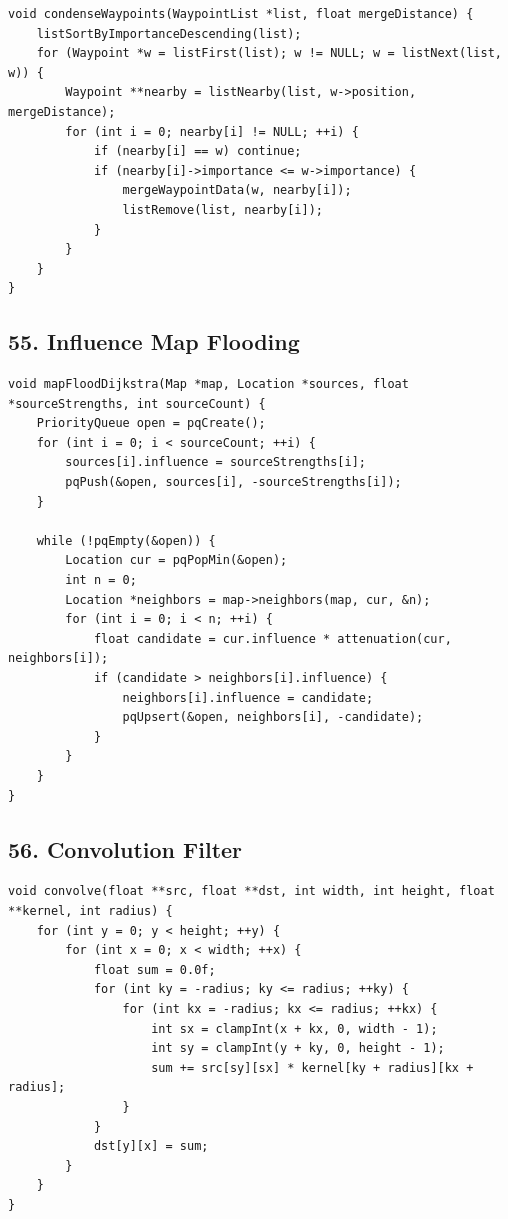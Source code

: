\documentclass[10pt,letterpaper]{article}
\begin{document}
\begin{verbatim}
void condenseWaypoints(WaypointList *list, float mergeDistance) {
    listSortByImportanceDescending(list);
    for (Waypoint *w = listFirst(list); w != NULL; w = listNext(list, w)) {
        Waypoint **nearby = listNearby(list, w->position, mergeDistance);
        for (int i = 0; nearby[i] != NULL; ++i) {
            if (nearby[i] == w) continue;
            if (nearby[i]->importance <= w->importance) {
                mergeWaypointData(w, nearby[i]);
                listRemove(list, nearby[i]);
            }
        }
    }
}
\end{verbatim}

\subsection*{55. Influence Map Flooding}
{}

\begin{verbatim}
void mapFloodDijkstra(Map *map, Location *sources, float *sourceStrengths, int sourceCount) {
    PriorityQueue open = pqCreate();
    for (int i = 0; i < sourceCount; ++i) {
        sources[i].influence = sourceStrengths[i];
        pqPush(&open, sources[i], -sourceStrengths[i]);
    }

    while (!pqEmpty(&open)) {
        Location cur = pqPopMin(&open);
        int n = 0;
        Location *neighbors = map->neighbors(map, cur, &n);
        for (int i = 0; i < n; ++i) {
            float candidate = cur.influence * attenuation(cur, neighbors[i]);
            if (candidate > neighbors[i].influence) {
                neighbors[i].influence = candidate;
                pqUpsert(&open, neighbors[i], -candidate);
            }
        }
    }
}
\end{verbatim}

\subsection*{56. Convolution Filter}
{}

\begin{verbatim}
void convolve(float **src, float **dst, int width, int height, float **kernel, int radius) {
    for (int y = 0; y < height; ++y) {
        for (int x = 0; x < width; ++x) {
            float sum = 0.0f;
            for (int ky = -radius; ky <= radius; ++ky) {
                for (int kx = -radius; kx <= radius; ++kx) {
                    int sx = clampInt(x + kx, 0, width - 1);
                    int sy = clampInt(y + ky, 0, height - 1);
                    sum += src[sy][sx] * kernel[ky + radius][kx + radius];
                }
            }
            dst[y][x] = sum;
        }
    }
}
\end{verbatim}
\end{document}
